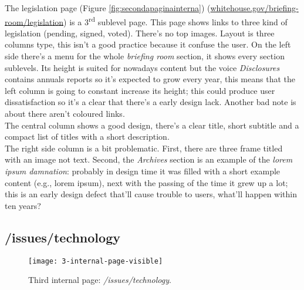 \documentclass[
10pt, %
a4paper, %
oneside, %
headinclude,footinclude, %
BCOR5mm, %
]{scrartcl}
\begin{document}
	
	The legislation page (Figure \ref{fig:secondapaginainterna}) (\href{http://www.whitehouse.gov/briefing-room/legislation}{whitehouse.gov/briefing-room/legislation}) is a 3\textsuperscript{rd} sublevel page. This page shows links to three kind of legislation (pending, signed, voted). There's no top images. Layout is three columns type, this isn't a good practice because it confuse the user. On the left side there's a menu for the whole \emph{briefing room} section, it shows every section sublevels. Its height is suited for nowadays content but the voice \emph{Disclosures} contains annuals reports so it's expected to grow every year, this means that the left column is going to constant increase its height; this could produce user dissatisfaction so it's a clear that there's a early design lack. Another bad note is about there aren't coloured links. \\
	The central column shows a good design, there's a clear title, short subtitle and a compact list of titles with a short description. \\
	The right side column is a bit problematic. First, there are three frame titled with an image not text. Second, the \emph{Archives} section is an example of the \emph{lorem ipsum damnation}: probably in design time it was filled with a short example content (e.g., lorem ipsum), next with the passing of the time it grew up a lot; this is an early design defect that'll cause trouble to users, what'll happen within ten years?
	

	\subsection{/issues/technology}
	\label{terzapaginainterna} 


	\begin{figure}[h!]
	\centering 
	\centerline{\texttt{[image: 3-internal-page-visible]}}
	\caption[Third internal page: /issues/technology]{Third internal page: \emph{/issues/technology}.}
	\label{fig:terzapaginainterna} 
	\end{figure}
	
\end{document}
